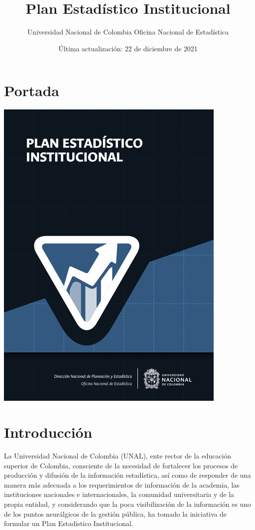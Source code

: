 \documentclass[
]{book}
\title{Plan Estadístico Institucional}
\author{ Universidad Nacional de Colombia Oficina Nacional de Estadística}
\date{Última actualización: 22 de diciembre de 2021}
\begin{document}
\maketitle

{
\setcounter{tocdepth}{1}
\tableofcontents
}
\hypertarget{portada}{%
\chapter*{Portada}\label{portada}}

\begin{center}\includegraphics[width=0.75\linewidth]{Imagenes/Portada Final} \end{center}

\hypertarget{intro}{%
\chapter{Introducción}\label{intro}}

La Universidad Nacional de Colombia (UNAL), ente rector de la educación superior de Colombia, consciente de la necesidad de fortalecer los procesos de producción y difusión de la información estadística, así como de responder de una manera más adecuada a los requerimientos de información de la academia, las instituciones nacionales e internacionales, la comunidad universitaria y de la propia entidad, y considerando que la poca visibilización de la información es uno de los puntos neurálgicos de la gestión pública, ha tomado la iniciativa de formular un Plan Estadístico Institucional.
\end{document}
